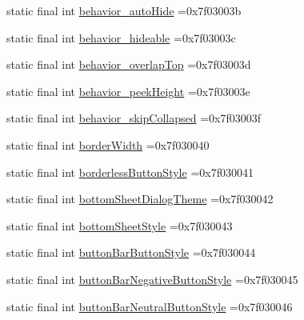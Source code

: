 \begin{DoxyCompactItemize}
\item 
static final int \mbox{\hyperlink{classcom_1_1example_1_1trainawearapplication_1_1_r_1_1attr_a63457619a6d2efa1096cd7ba7d1276a1}{behavior\+\_\+auto\+Hide}} =0x7f03003b
\item 
static final int \mbox{\hyperlink{classcom_1_1example_1_1trainawearapplication_1_1_r_1_1attr_ab06b67c18c051f07b70a511620d21628}{behavior\+\_\+hideable}} =0x7f03003c
\item 
static final int \mbox{\hyperlink{classcom_1_1example_1_1trainawearapplication_1_1_r_1_1attr_afd4113ebdac59e4f62e63e871fae98a6}{behavior\+\_\+overlap\+Top}} =0x7f03003d
\item 
static final int \mbox{\hyperlink{classcom_1_1example_1_1trainawearapplication_1_1_r_1_1attr_a93a13fc1ac0f4f12ec5f570d995e3b3e}{behavior\+\_\+peek\+Height}} =0x7f03003e
\item 
static final int \mbox{\hyperlink{classcom_1_1example_1_1trainawearapplication_1_1_r_1_1attr_a8f636fedcc6932a7cef59833376e30a2}{behavior\+\_\+skip\+Collapsed}} =0x7f03003f
\item 
static final int \mbox{\hyperlink{classcom_1_1example_1_1trainawearapplication_1_1_r_1_1attr_a78ec18f0adc154f9a3171fda31fc404d}{border\+Width}} =0x7f030040
\item 
static final int \mbox{\hyperlink{classcom_1_1example_1_1trainawearapplication_1_1_r_1_1attr_a7961cc6cd19f50268c9ab94248744ff1}{borderless\+Button\+Style}} =0x7f030041
\item 
static final int \mbox{\hyperlink{classcom_1_1example_1_1trainawearapplication_1_1_r_1_1attr_aa00aff2f92ba986c849c82621df3e2c9}{bottom\+Sheet\+Dialog\+Theme}} =0x7f030042
\item 
static final int \mbox{\hyperlink{classcom_1_1example_1_1trainawearapplication_1_1_r_1_1attr_ae5a66b0ae525a15224d600774d5eba5c}{bottom\+Sheet\+Style}} =0x7f030043
\item 
static final int \mbox{\hyperlink{classcom_1_1example_1_1trainawearapplication_1_1_r_1_1attr_a35493a456a4ca163adf9f78790d512cb}{button\+Bar\+Button\+Style}} =0x7f030044
\item 
static final int \mbox{\hyperlink{classcom_1_1example_1_1trainawearapplication_1_1_r_1_1attr_a41f5e6623fb45ddd8bcd10ccbb32e4f4}{button\+Bar\+Negative\+Button\+Style}} =0x7f030045
\item 
static final int \mbox{\hyperlink{classcom_1_1example_1_1trainawearapplication_1_1_r_1_1attr_a60dce193206c761a96e6246383b7c600}{button\+Bar\+Neutral\+Button\+Style}} =0x7f030046
\item 

\end{DoxyCompactItemize}
